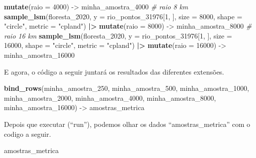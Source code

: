 \documentclass[
]{article}
\newenvironment{Shaded}{\begin{snugshade}}{\end{snugshade}}
\newcommand{\AttributeTok}[1]{\textcolor[rgb]{0.13,0.29,0.53}{#1}}
\newcommand{\CommentTok}[1]{\textcolor[rgb]{0.56,0.35,0.01}{\textit{#1}}}
\newcommand{\DecValTok}[1]{\textcolor[rgb]{0.00,0.00,0.81}{#1}}
\newcommand{\FunctionTok}[1]{\textcolor[rgb]{0.13,0.29,0.53}{\textbf{#1}}}
\newcommand{\NormalTok}[1]{#1}
\newcommand{\OtherTok}[1]{\textcolor[rgb]{0.56,0.35,0.01}{#1}}
\newcommand{\SpecialCharTok}[1]{\textcolor[rgb]{0.81,0.36,0.00}{\textbf{#1}}}
\newcommand{\StringTok}[1]{\textcolor[rgb]{0.31,0.60,0.02}{#1}}
\begin{document}
\begin{Shaded}
\begin{Highlighting}[]
  \FunctionTok{mutate}\NormalTok{(}\AttributeTok{raio =} \DecValTok{4000}\NormalTok{) }\OtherTok{{-}\textgreater{}}\NormalTok{ minha\_amostra\_4000}
\CommentTok{\# raio 8 km}
\FunctionTok{sample\_lsm}\NormalTok{(floresta\_2020, }\AttributeTok{y =}\NormalTok{ rio\_pontos\_31976[}\DecValTok{1}\NormalTok{, ], }
           \AttributeTok{size =} \DecValTok{8000}\NormalTok{, }\AttributeTok{shape =} \StringTok{"circle"}\NormalTok{, }
           \AttributeTok{metric =} \StringTok{"cpland"}\NormalTok{)  }\SpecialCharTok{|\textgreater{}} 
  \FunctionTok{mutate}\NormalTok{(}\AttributeTok{raio =} \DecValTok{8000}\NormalTok{) }\OtherTok{{-}\textgreater{}}\NormalTok{ minha\_amostra\_8000}
\CommentTok{\# raio 16 km}
\FunctionTok{sample\_lsm}\NormalTok{(floresta\_2020, }\AttributeTok{y =}\NormalTok{ rio\_pontos\_31976[}\DecValTok{1}\NormalTok{, ], }
           \AttributeTok{size =} \DecValTok{16000}\NormalTok{, }\AttributeTok{shape =} \StringTok{"circle"}\NormalTok{, }
           \AttributeTok{metric =} \StringTok{"cpland"}\NormalTok{)  }\SpecialCharTok{|\textgreater{}} 
  \FunctionTok{mutate}\NormalTok{(}\AttributeTok{raio =} \DecValTok{16000}\NormalTok{) }\OtherTok{{-}\textgreater{}}\NormalTok{ minha\_amostra\_16000}
\end{Highlighting}
\end{Shaded}

\newpage

E agora, o código a seguir juntará os resultados das diferentes extensões.

\begin{Shaded}
\begin{Highlighting}[]
\FunctionTok{bind\_rows}\NormalTok{(minha\_amostra\_250, }
\NormalTok{          minha\_amostra\_500, }
\NormalTok{          minha\_amostra\_1000, }
\NormalTok{          minha\_amostra\_2000, }
\NormalTok{          minha\_amostra\_4000, }
\NormalTok{          minha\_amostra\_8000, }
\NormalTok{          minha\_amostra\_16000) }\OtherTok{{-}\textgreater{}}\NormalTok{ amostras\_metrica}
\end{Highlighting}
\end{Shaded}

Depois que executar (``run''), podemos olhar os dados ``amostras\_metrica'' com o codigo a seguir.

\begin{Shaded}
\begin{Highlighting}[]
\NormalTok{amostras\_metrica}
\end{Highlighting}
\end{Shaded}
\end{document}

